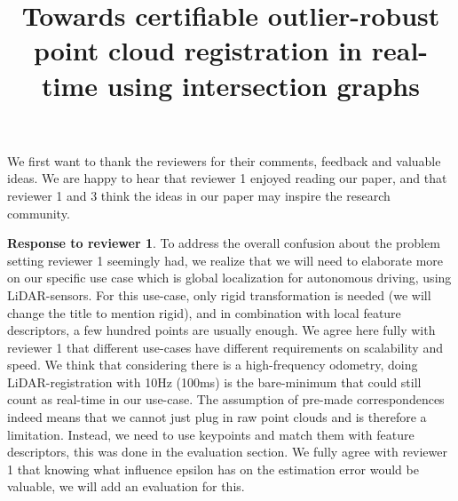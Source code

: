 \documentclass[10pt,twocolumn,letterpaper]{article}
\begin{document}
\title{Towards certifiable outlier-robust point cloud registration in real-time using intersection graphs}  %

\maketitle
\thispagestyle{empty}
\appendix

We first want to thank the reviewers for their comments, feedback and valuable ideas.
We are happy to hear that reviewer 1 enjoyed reading our paper, and that reviewer 1 and 3 think the ideas in our paper may inspire the research community.

\textbf{Response to reviewer 1}. To address the overall confusion about the problem setting reviewer 1 seemingly had, we realize that we will need to elaborate more on our specific use case which is global localization for autonomous driving, using LiDAR-sensors. For this use-case, only rigid transformation is needed (we will change the title to mention rigid), and in combination with local feature descriptors, a few hundred points are usually enough. We agree here fully with reviewer 1 that different use-cases have different requirements on scalability and speed. We think that considering there is a high-frequency odometry, doing LiDAR-registration with 10Hz (100ms) is the bare-minimum that could still count as real-time in our use-case.
The assumption of pre-made correspondences indeed means that we cannot just plug in raw point clouds and is therefore a limitation. Instead, we need to use keypoints and match them with feature descriptors, this was done in the evaluation section.
We fully agree with reviewer 1 that knowing what influence epsilon has on the estimation error \cite{antonante2024-robust-perception} would be valuable, we will add an evaluation for this.
\end{document}
